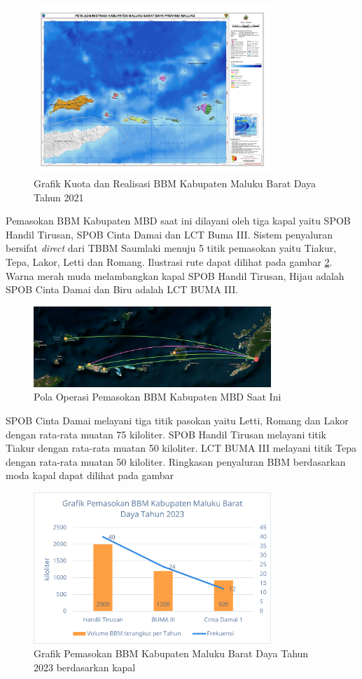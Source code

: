 \begin{figure}[htbp!]
    \centering
    \includegraphics[width=0.8\textwidth]{gambar/administrasi-maluku-barat-daya-a1.jpg}
    \caption{Grafik Kuota dan Realisasi BBM Kabupaten Maluku Barat Daya Tahun 2021 \citep{Pertamina_2021}}
    \label{fig:realisasi-bbm-mbd}
\end{figure}

    Pemasokan BBM Kabupaten MBD saat ini dilayani oleh tiga kapal yaitu SPOB Handil Tirusan, SPOB Cinta Damai dan LCT Buma III.
    Sistem penyaluran bersifat \emph{direct} dari TBBM Saumlaki menuju 5 titik pemasokan yaitu Tiakur, Tepa, Lakor, Letti dan Romang. Ilustrasi rute dapat dilihat pada gambar \ref{fig:rute-old-bbm-mbd}. Warna merah muda melambangkan kapal SPOB Handil Tirusan, Hijau adalah SPOB Cinta Damai dan Biru adalah LCT BUMA III.

\begin{figure}[htbp!]
    \centering
    \includegraphics[width=0.8\textwidth]{gambar/rute-eksisting.png}
    \caption{Pola Operasi Pemasokan BBM Kabupaten MBD Saat Ini}
    \label{fig:rute-old-bbm-mbd}
\end{figure}

    SPOB Cinta Damai melayani tiga titik pasokan yaitu Letti, Romang dan Lakor dengan rata-rata muatan 75 kiloliter. SPOB Handil Tirusan melayani titik Tiakur dengan rata-rata muatan 50 kiloliter. LCT BUMA III melayani titik Tepa dengan rata-rata muatan 50 kiloliter. Ringkasan penyaluran BBM berdasarkan moda kapal dapat dilihat pada gambar 

\begin{figure}[htbp!]
    \centering
    \includegraphics[width=0.8\textwidth]{gambar/pemasokan-BBM-MBD.png}
    \caption{Grafik Pemasokan BBM Kabupaten Maluku Barat Daya Tahun 2023 berdasarkan kapal}
    \label{fig:kapal-mbd-old}
\end{figure}